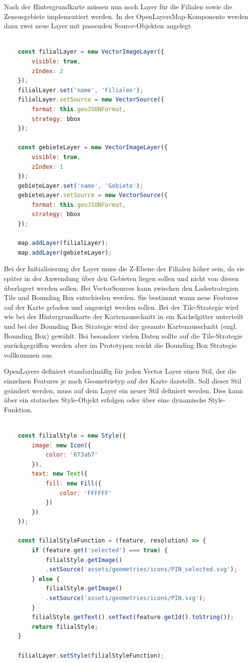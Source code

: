 Nach der Hintergrundkarte müssen nun noch Layer für die Filialen sowie die Zensusgebiete implementiert werden.
In der OpenLayersMap-Komponente werden dazu zwei neue Layer mit passenden Source-Objekten angelegt.

\begin{lstlisting}[language=JavaScript]

	const filialLayer = new VectorImageLayer({
		visible: true,
		zIndex: 2
	});	
	filialLayer.set('name', 'Filialen');
	filialLayer.setSource = new VectorSource({
		format: this.geoJSONFormat,
		strategy: bbox	
	});

	const gebieteLayer = new VectorImageLayer({
		visible: true,
		zIndex: 1
	});
	gebieteLayer.set('name', 'Gebiete');
	gebieteLayer.setSource = new VectorSource({
		format: this.geoJSONFormat,
		strategy: bbox	
	});

	map.addLayer(filialLayer);
	map.addLayer(gebieteLayer);
\end{lstlisting}

Bei der Initialisierung der Layer muss die Z-Ebene der Filialen höher sein, da sie später in der Anwendung über den Gebieten liegen sollen und nicht von diesen überlagert werden sollen.
Bei VectorSources kann zwischen den Ladestrategien Tile und Bounding Box entschieden werden.
Sie bestimmt wann neue Features auf der Karte geladen und angezeigt werden sollen.
Bei der Tile-Strategie wird wie bei der Hintergrundkarte der Kartenausschnitt in ein Kachelgitter unterteilt und bei der Bounding Box Strategie wird der gesamte Kartenausschnitt (engl. Bounding Box) gewählt. 
Bei besonders vielen Daten sollte auf die Tile-Strategie zurückgegriffen werden aber im Prototypen reicht die Bounding Box Strategie vollkommen aus.

OpenLayers definiert standardmäßig für jeden Vector Layer einen Stil, der die einzelnen Features je nach Geometrietyp auf der Karte darstellt. 
Soll dieser Stil geändert werden, muss auf dem Layer ein neuer Stil definiert werden.
Dies kann über ein statisches Style-Objekt erfolgen oder über eine dynamische Style-Funktion.

\begin{lstlisting}[language=JavaScript, label={code:filialStyle}]
	
	const filialStyle = new Style({
		image: new Icon({
			color: '673ab7'
		}),
		text: new Text({
			fill: new Fill({
				color: 'FFFFFF'
			})	
		})
	});
	
	const filialStyleFunction = (feature, resolution) => {
		if (feature.get('selected') === true) {
			filialStyle.getImage()
			.setSource('assets/geometries/icons/PIN_selected.svg');
		} else {
			filialStyle.getImage()
			.setSource('assets/geometries/icons/PIN.svg');
		}
		filialStyle.getText().setText(feature.getId().toString());
		return filialStyle;
	}
	
	filialLayer.setStyle(filialStyleFunction);

	
\end{lstlisting}

